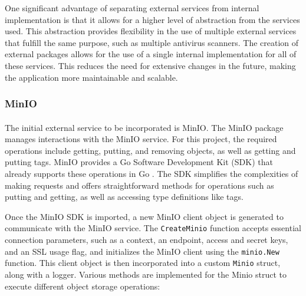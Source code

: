\documentclass[12pt, conference, final, a4paper, onecolumn, compsoc]{IEEEtran}
\begin{document}
One significant advantage of separating external services from internal
implementation is that it allows for a higher level of abstraction from the
services used. This abstraction provides flexibility in the use of multiple
external services that fulfill the same purpose, such as multiple antivirus
scanners. The creation of external packages allows for the use of a single
internal implementation for all of these services. This reduces the need for
extensive changes in the future, making the application more maintainable and
scalable.

\subsubsection*{MinIO}
\paragraph{}

The initial external service to be incorporated is MinIO. The MinIO package
manages interactions with the MinIO service. For this project, the required
operations include getting, putting, and removing objects, as well as getting
and putting tags. MinIO provides a Go Software Development Kit (SDK) that
already supports these operations in Go \citep{minio-go-repo}. The SDK
simplifies the complexities of making requests and offers straightforward
methods for operations such as putting and getting, as well as accessing type
definitions like tags.

Once the MinIO SDK is imported, a new MinIO client object is generated to
communicate with the MinIO service. The \texttt{CreateMinio} function accepts
essential connection parameters, such as a context, an endpoint, access and
secret keys, and an SSL usage flag, and initializes the MinIO client using the
\texttt{minio.New} function. This client object is then incorporated into a
custom \texttt{Minio} struct, along with a logger. Various methods are
implemented for the Minio struct to execute different object storage operations:
\end{document}
